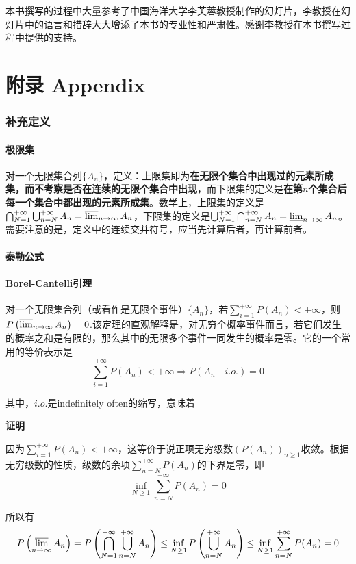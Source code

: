 \documentclass[UTF8]{ctexbook}
\begin{document}
本书撰写的过程中大量参考了中国海洋大学李芙蓉教授制作的幻灯片，李教授在幻灯片中的语言和措辞大大增添了本书的专业性和严肃性。感谢李教授在本书撰写过程中提供的支持。
\chapter*{附录 Appendix}
\subsection{补充定义}
\subsubsection{极限集}
对一个无限集合列$\{A_n\}$，定义：上限集即为\textbf{在无限个集合中出现过的元素所成集，而不考察是否在连续的无限个集合中出现}，而下限集的定义是\textbf{在第$n$个集合后每一个集合中都出现的元素所成集}。数学上，上限集的定义是$\bigcap_{N=1}^{+\infty}\bigcup_{n=N}^{+\infty}A_n=\varlimsup_{n\to\infty}A_n$，下限集的定义是$\bigcup_{N=1}^{+\infty}\bigcap_{n=N}^{+\infty}A_n=\varliminf_{n\to\infty}A_n$。需要注意的是，定义中的连续交并符号，应当先计算后者，再计算前者。
\subsubsection{泰勒公式}
\label{taylors-theorem}

\subsubsection{Borel-Cantelli引理}
\label{borel-cantelli-lemma}
对一个无限集合列（或看作是无限个事件）$\{A_n\}$，若$\sum_{i=1}^{+\infty}P(A_n)<+\infty$，则$P\left(\varlimsup_{n\to\infty}A_n\right)=0$.该定理的直观解释是，对无穷个概率事件而言，若它们发生的概率之和是有限的，那么其中的无限多个事件一同发生的概率是零。它的一个常用的等价表示是
\[
	\sum_{i=1}^{+\infty}P(A_n)<+\infty\Longrightarrow P(A_n\quad i.o.)=0
\]

其中，$i.o.$是indefinitely often的缩写，意味着

\noindent\textbf{证明}

因为$\sum_{i=1}^{+\infty}P(A_n)<+\infty$，这等价于说正项无穷级数$(P(A_n))_{n\geq 1}$收敛。根据无穷级数的性质，级数的余项$\sum_{n=N}^{+\infty}P(A_n)$的下界是零，即
\[
	\inf_{N\geq 1}\sum_{n=N}^{+\infty}P(A_n)=0
\]

所以有
\[
	P\left(\varlimsup_{n\to\infty}A_n\right)=P\left(\bigcap_{N=1}^{+\infty}\bigcup_{n=N}^{+\infty}A_n\right)\leq\inf_{N\geq 1}P\left(\bigcup_{n=N}^{+\infty}A_n\right)\leq\inf_{N\geq 1}\sum_{n=N}^{+\infty}P(A_n)=0
\]
\end{document}
